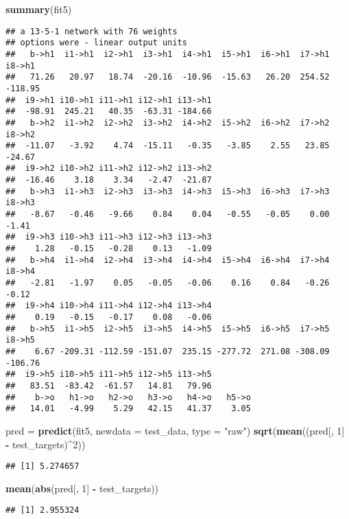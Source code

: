 \documentclass[10pt,ignorenonframetext,]{beamer}
\newenvironment{Shaded}{\begin{snugshade}}{\end{snugshade}}
\newcommand{\DataTypeTok}[1]{\textcolor[rgb]{0.13,0.29,0.53}{#1}}
\newcommand{\DecValTok}[1]{\textcolor[rgb]{0.00,0.00,0.81}{#1}}
\newcommand{\KeywordTok}[1]{\textcolor[rgb]{0.13,0.29,0.53}{\textbf{#1}}}
\newcommand{\NormalTok}[1]{#1}
\newcommand{\OperatorTok}[1]{\textcolor[rgb]{0.81,0.36,0.00}{\textbf{#1}}}
\newcommand{\StringTok}[1]{\textcolor[rgb]{0.31,0.60,0.02}{#1}}
\begin{document}
\begin{frame}[fragile]
\begin{Shaded}
\begin{Highlighting}[]
\KeywordTok{summary}\NormalTok{(fit5)}
\end{Highlighting}
\end{Shaded}

\begin{verbatim}
## a 13-5-1 network with 76 weights
## options were - linear output units 
##   b->h1  i1->h1  i2->h1  i3->h1  i4->h1  i5->h1  i6->h1  i7->h1  i8->h1 
##   71.26   20.97   18.74  -20.16  -10.96  -15.63   26.20  254.52 -118.95 
##  i9->h1 i10->h1 i11->h1 i12->h1 i13->h1 
##  -98.91  245.21   40.35  -63.31 -184.66 
##   b->h2  i1->h2  i2->h2  i3->h2  i4->h2  i5->h2  i6->h2  i7->h2  i8->h2 
##  -11.07   -3.92    4.74  -15.11   -0.35   -3.85    2.55   23.85  -24.67 
##  i9->h2 i10->h2 i11->h2 i12->h2 i13->h2 
##  -16.46    3.18    3.34   -2.47  -21.87 
##   b->h3  i1->h3  i2->h3  i3->h3  i4->h3  i5->h3  i6->h3  i7->h3  i8->h3 
##   -8.67   -0.46   -9.66    0.84    0.04   -0.55   -0.05    0.00   -1.41 
##  i9->h3 i10->h3 i11->h3 i12->h3 i13->h3 
##    1.28   -0.15   -0.28    0.13   -1.09 
##   b->h4  i1->h4  i2->h4  i3->h4  i4->h4  i5->h4  i6->h4  i7->h4  i8->h4 
##   -2.81   -1.97    0.05   -0.05   -0.06    0.16    0.84   -0.26   -0.12 
##  i9->h4 i10->h4 i11->h4 i12->h4 i13->h4 
##    0.19   -0.15   -0.17    0.08   -0.06 
##   b->h5  i1->h5  i2->h5  i3->h5  i4->h5  i5->h5  i6->h5  i7->h5  i8->h5 
##    6.67 -209.31 -112.59 -151.07  235.15 -277.72  271.08 -308.09 -106.76 
##  i9->h5 i10->h5 i11->h5 i12->h5 i13->h5 
##   83.51  -83.42  -61.57   14.81   79.96 
##    b->o   h1->o   h2->o   h3->o   h4->o   h5->o 
##   14.01   -4.99    5.29   42.15   41.37    3.05
\end{verbatim}

\begin{Shaded}
\begin{Highlighting}[]
\NormalTok{pred =}\StringTok{ }\KeywordTok{predict}\NormalTok{(fit5, }\DataTypeTok{newdata =}\NormalTok{ test_data, }\DataTypeTok{type =} \StringTok{"raw"}\NormalTok{)}
\KeywordTok{sqrt}\NormalTok{(}\KeywordTok{mean}\NormalTok{((pred[, }\DecValTok{1}\NormalTok{] }\OperatorTok{-}\StringTok{ }\NormalTok{test_targets)}\OperatorTok{^}\DecValTok{2}\NormalTok{))}
\end{Highlighting}
\end{Shaded}

\begin{verbatim}
## [1] 5.274657
\end{verbatim}

\begin{Shaded}
\begin{Highlighting}[]
\KeywordTok{mean}\NormalTok{(}\KeywordTok{abs}\NormalTok{(pred[, }\DecValTok{1}\NormalTok{] }\OperatorTok{-}\StringTok{ }\NormalTok{test_targets))}
\end{Highlighting}
\end{Shaded}

\begin{verbatim}
## [1] 2.955324
\end{verbatim}

\end{frame}
\end{document}

